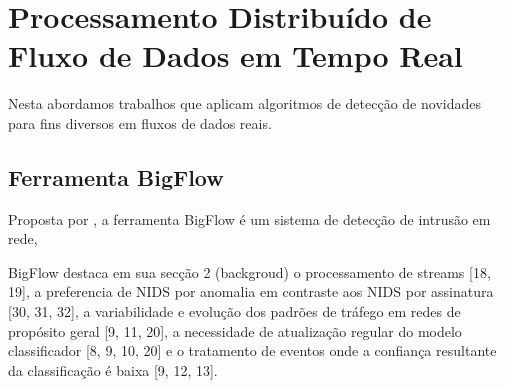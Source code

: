 






\section{Processamento Distribuído de Fluxo de Dados em Tempo Real}

Nesta \Section abordamos trabalhos que aplicam algoritmos de detecção de
novidades para fins diversos em fluxos de dados reais.

\subsection{Ferramenta BigFlow}


Proposta por , a ferramenta BigFlow é um sistema de
detecção de intrusão em rede, 


\cite{mawiSamplepointF,Fontugne2010}
BigFlow destaca em sua secção 2 (backgroud) o processamento de streams [18, 19],
a preferencia de NIDS por anomalia em contraste aos NIDS por assinatura [30, 31, 32],
a variabilidade e evolução dos padrões de tráfego em redes de propósito geral [9, 11, 20],
a necessidade de atualização regular do modelo classificador [8, 9, 10, 20] e
o tratamento de eventos onde a confiança resultante da classificação é baixa [9, 12, 13].

